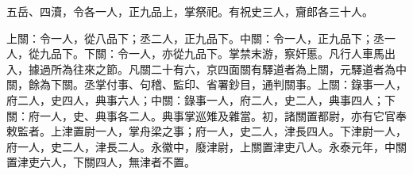 \begin{pinyinscope}
 五岳、四瀆，令各一人，正九品上，掌祭祀。有祝史三人，齎郎各三十人。



 上關：令一人，從八品下；丞二人，正九品下。中關：令一人，正九品下；丞一人，從九品下。下關：令一人，亦從九品下。掌禁末游，察奸慝。凡行人車馬出入，據過所為往來之節。凡關二十有六，京四面關有驛道者為上關，元驛道者為中關，餘為下關。丞掌付事、句稽、監印、省署鈔目，通判關事。上關：錄事一人，府二人，史四人，典事六人；中關：錄事一人，府二人，史二人，典事四人；下關：府一人，史、典事各二人。典事掌巡雉及雜當。初，諸關置都尉，亦有它官奉敕監者。上津置尉一人，掌舟梁之事；府一人，史二人，津長四人。下津尉一人，府一人，史二人，津長二人。永徽中，廢津尉，上關置津吏八人。永泰元年，中關置津吏六人，下關四人，無津者不置。



\end{pinyinscope}